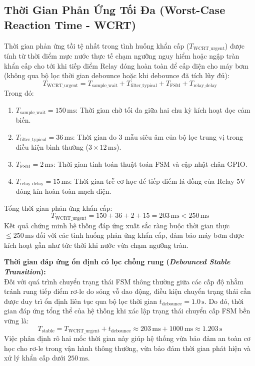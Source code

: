 \subsection{Thời Gian Phản Ứng Tối Đa (Worst-Case Reaction Time - WCRT)}
\label{sec:wcrt_analysis}
Thời gian phản ứng tồi tệ nhất trong tình huống khẩn cấp ($T_{\text{WCRT\_urgent}}$) được tính từ thời điểm mực nước thực tế chạm ngưỡng nguy hiểm hoặc ngập tràn khẩn cấp cho tới khi tiếp điểm Relay đóng hoàn toàn để cấp điện cho máy bơm (không qua bộ lọc thời gian debounce hoặc khi debounce đã tích lũy đủ):
\begin{equation}
T_{\text{WCRT\_urgent}} = T_{\text{sample\_wait}} + T_{\text{filter\_typical}} + T_{\text{FSM}} + T_{\text{relay\_delay}}
\end{equation}
Trong đó:
\begin{enumerate}
    \item $T_{\text{sample\_wait}} = 150\,\text{ms}$: Thời gian chờ tối đa giữa hai chu kỳ kích hoạt đọc cảm biến.
    \item $T_{\text{filter\_typical}} = 36\,\text{ms}$: Thời gian đo 3 mẫu siêu âm của bộ lọc trung vị trong điều kiện bình thường ($3 \times 12\,\text{ms}$).
    \item $T_{\text{FSM}} = 2\,\text{ms}$: Thời gian tính toán thuật toán FSM và cập nhật chân GPIO.
    \item $T_{\text{relay\_delay}} = 15\,\text{ms}$: Thời gian trễ cơ học để tiếp điểm lá đồng của Relay 5V đóng kín hoàn toàn mạch điện.
\end{enumerate}
Tổng thời gian phản ứng khẩn cấp:
\begin{equation}
T_{\text{WCRT\_urgent}} = 150 + 36 + 2 + 15 = 203\,\text{ms} < 250\,\text{ms}
\end{equation}
Kết quả chứng minh hệ thống đáp ứng xuất sắc ràng buộc thời gian thực $\le 250\,\text{ms}$ đối với các tình huống phản ứng khẩn cấp, đảm bảo máy bơm được kích hoạt gần như tức thời khi nước vừa chạm ngưỡng tràn.

\noindent\textbf{Thời gian đáp ứng ổn định có lọc chống rung (\textit{Debounced Stable Transition}):}\\
Đối với quá trình chuyển trạng thái FSM thông thường giữa các cấp độ nhằm tránh rung tiếp điểm rơ-le do sóng vỗ dao động, điều kiện chuyển trạng thái cần được duy trì ổn định liên tục qua bộ lọc thời gian $t_{\text{debounce}} = 1.0\,\text{s}$. Do đó, thời gian đáp ứng tổng thể của hệ thống khi xác lập trạng thái chuyển cấp FSM bền vững là:
\begin{equation}
T_{\text{stable}} = T_{\text{WCRT\_urgent}} + t_{\text{debounce}} \approx 203\,\text{ms} + 1000\,\text{ms} \approx 1.203\,\text{s}
\end{equation}
Việc phân định rõ hai mốc thời gian này giúp hệ thống vừa bảo đảm an toàn cơ học cho rơ-le trong vận hành thông thường, vừa bảo đảm thời gian phát hiện và xử lý khẩn cấp dưới $250\,\text{ms}$.


